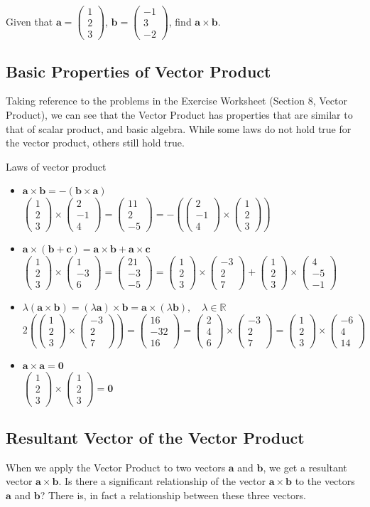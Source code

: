 \documentclass[a4paper]{book}
\newcommand{\cvv}[3]{\begin{pmatrix}#1\\#2\\#3\end{pmatrix}}
\begin{document}
\begin{example}
Given that $\mathbf a=\cvv{1}{2}{3}$, $\mathbf b=\cvv{-1}{3}{-2}$, find $\mathbf a\times\mathbf b$.
\end{example}
\solution{
\[
\begin{aligned}
\cvv{1}{2}{3}\times\cvv{-1}{3}{-2}&=\cvv{2(-2)-3(3)}{3(-1)-1(-2)}{1(3)-2(-1)}\\
\therefore\ \mathbf a\times\mathbf b&=\cvv{-13}{-1}{5}
\end{aligned}
\]}


\subsection{Basic Properties of Vector Product}
Taking reference to the problems in the Exercise Worksheet (Section 8, Vector Product), we can see that the Vector Product has properties that are similar to that of scalar product, and basic algebra. While some laws do not hold true for the vector product, others still hold true.

\begin{theorem}{Laws of vector product}
\begin{itemize}
\item $\mathbf a\times\mathbf b=-(\mathbf b\times\mathbf a)$\\
{\small\color{black!50}$\cvv{1}{2}{3}\times\cvv{2}{-1}{4}=\cvv{11}{2}{-5}=-\left(\cvv{2}{-1}{4}\times\cvv{1}{2}{3}\right)$}
\item $\mathbf a\times(\mathbf b+\mathbf c)=\mathbf a\times\mathbf b+\mathbf a\times\mathbf c$\\
{\small\color{black!50}$\cvv{1}{2}{3}\times\cvv{1}{-3}{6}=\cvv{21}{-3}{-5}=\cvv{1}{2}{3}\times\cvv{-3}{2}{7}+\cvv{1}{2}{3}\times\cvv{4}{-5}{-1}$}
\item $\lambda(\mathbf a\times\mathbf b)=(\lambda\mathbf a)\times\mathbf b=\mathbf a\times(\lambda\mathbf b),\quad\lambda\in\mathbb R$\\
{\small\color{black!50}$2\left(\cvv{1}{2}{3}\times\cvv{-3}{2}{7}\right)=\cvv{16}{-32}{16}=\cvv{2}{4}{6}\times\cvv{-3}{2}{7}=\cvv{1}{2}{3}\times\cvv{-6}{4}{14}$}
\item $\mathbf a\times\mathbf a=\mathbf 0$\\
{\small\color{black!50}$\cvv{1}{2}{3}\times\cvv{1}{2}{3}=\mathbf 0$}
\end{itemize}
\end{theorem}

\subsection{Resultant Vector of the Vector Product}
When we apply the Vector Product to two vectors $\mathbf a$ and $\mathbf b$, we get a resultant vector $\mathbf a\times\mathbf b$. Is there a significant relationship of the vector $\mathbf a\times\mathbf b$ to the vectors $\mathbf a$ and $\mathbf b$? There is, in fact a relationship between these three vectors.
\end{document}
